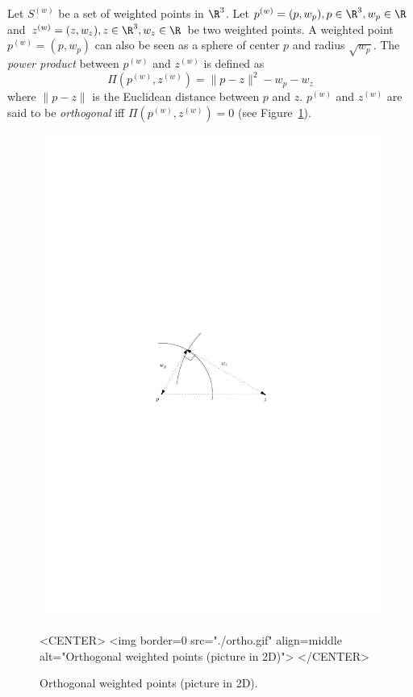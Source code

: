Let ${S}^{(w)}$ be a set of weighted points in $\R^3$. Let
${p}^{(w)}=(p,w_p), p\in\R^3, w_p\in\R$ and 
${z}^{(w)}=(z,w_z), z\in\R^3, w_z\in\R$ be two weighted points. 
A weighted point
${p}^{(w)}=(p,w_p)$ can also be seen as a sphere of center $p$ and
radius $\sqrt{w_p}$. 
The \textit{power product} between ${p}^{(w)}$ and ${z}^{(w)}$ is
defined as 
\[\Pi({p}^{(w)},{z}^{(w)}) = {\|{p-z}\|^2-w_p-w_z}\]
where $\|{p-z}\|$ is the Euclidean distance between $p$ and $z$. 
 ${p}^{(w)}$ and ${z}^{(w)}$
are said to be \textit{orthogonal} iff $\Pi{({p}^{(w)},{z}^{(w)})}
= 0$ (see Figure~\ref{Triangulation3-fig-ortho}).

\begin{figure}[htbp]
\begin{ccTexOnly}
\begin{center} 
\includegraphics{Triangulation_3/ortho} 
\end{center}
\end{ccTexOnly}
\begin{ccHtmlOnly}
<CENTER>
<img border=0 src="./ortho.gif" align=middle alt="Orthogonal weighted
points (picture in 2D)"> 
</CENTER>
\end{ccHtmlOnly}
\caption{Orthogonal weighted points (picture in 2D).
\label{Triangulation3-fig-ortho}}
\end{figure} 

